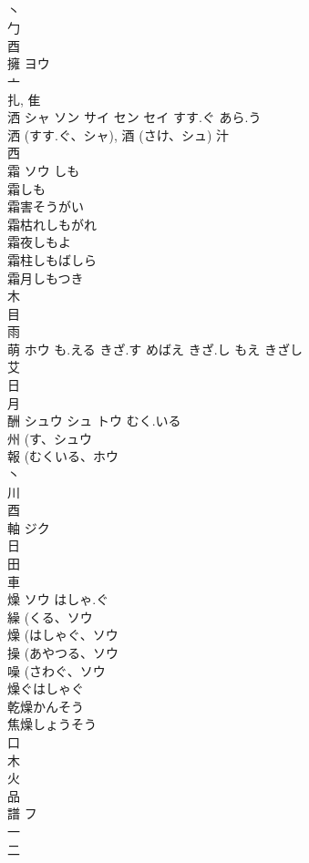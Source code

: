 \documentclass[8pt]{extreport}
\begin{document}
\begin{CJK}{UTF8}{min}
\\	丶 
\\	勹 
\\	酉 
\\	擁	ヨウ		
\\	亠 
\\	扎, 隹 
\\	洒	シャ ソン サイ セン セイ	すす.ぐ あら.う	
\\	洒 (すす.ぐ、シャ), 酒 (さけ、シュ)			汁 
\\	西 
\\	霜	ソウ	しも	
\\	霜しも 
\\	霜害そうがい 
\\	霜枯れしもがれ 
\\	霜夜しもよ 
\\	霜柱しもばしら 
\\	霜月しもつき 
\\	木 
\\	目 
\\	雨 
\\	萌	ホウ	も.える きざ.す めばえ きざ.し もえ きざし	
\\	艾 
\\	日 
\\	月 
\\	酬	シュウ シュ トウ	むく.いる	
\\	州 (す、シュウ 
\\	報 (むくいる、ホウ 
\\	丶 
\\	川 
\\	酉 
\\	軸	ジク		
\\	日 
\\	田 
\\	車 
\\	燥	ソウ	はしゃ.ぐ	
\\	繰 (くる、ソウ 
\\	燥 (はしゃぐ、ソウ 
\\	操 (あやつる、ソウ 
\\	噪 (さわぐ、ソウ 
\\	燥ぐはしゃぐ
\\	乾燥かんそう
\\	焦燥しょうそう
\\	口 
\\	木 
\\	火 
\\	品 
\\	譜	フ		
\\	一 
\\	二 

\end{CJK}
\end{document}
